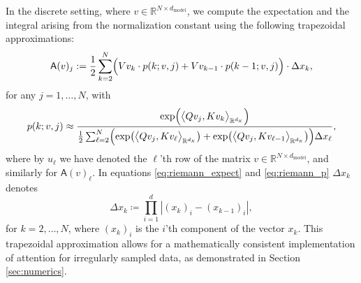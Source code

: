 \documentclass[twoside]{article}
\newcommand{\1}{\mathbbm{1}}
\newcommand{\R}{\mathbbm{R}}
\newcommand{\sA}{\mathsf{A}}
\newcommand{\dK}{d_\textrm{\scalebox{.7}{$K$}}}
\newcommand{\ml}[1]{{\color{cyan}{#1}}}
\providecommand{\mathbbm}{\mathbb} %
\begin{document}
In the discrete setting, where $v\in\R^{N\times d_{\textrm{model}}}$, we compute the expectation and the integral arising from the normalization constant using the following trapezoidal approximations:
\begin{equation}
\label{eq:riemann_expect}
    \sA(v)_j :=   \frac12\sum_{k=2}^N \Bigl( V{v_k} \cdot p(k;v,j) + V{v_{k-1}} \cdot p(k-1;v,j) \Bigr)\cdot \Delta x_k,
    \end{equation}
for any $j=1,\ldots,N$, with
\begin{equation}
\label{eq:riemann_p}
    p(k;v,j) \approx \frac{\exp\Bigl(\bigl\langle Q{v_j}, Kv_k \bigr\rangle_{\R^{\dK}} \Bigr)}{\frac12\sum_{\ell=2}^N \Bigl(\exp\bigl(\bigl\langle Q{v_j}, Kv_\ell \bigr\rangle_{\R^{\dK}} \bigr)+\exp\bigl(\bigl\langle Q{v_j}, Kv_{\ell-1} \bigr\rangle_{\R^{\dK}} \bigr)\Bigr)\Delta x_\ell},
\end{equation}
where by $u_\ell$ we have denoted the $\ell$'th row of the matrix $v\in \R^{N\times d_{\textrm{model}}}$, and similarly for $\sA(v)_\ell$.
%
In equations \eqref{eq:riemann_expect} and \eqref{eq:riemann_p} 
$\Delta x_k$
denotes 
\[
\Delta x_k \coloneqq \prod_{i=1}^d |(x_k)_i-(x_{k-1})_i|,
\]
for 
$k=2,\ldots,N$, where $(x_k)_i$ is the $i$'th component of the vector $x_k$.
This trapezoidal approximation allows for a mathematically consistent implementation of attention for irregularly sampled data, as demonstrated in Section \ref{sec:numerics}. 
\end{document}
